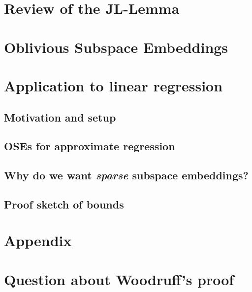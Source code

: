 \documentclass[11pt]{article}
\begin{document}
\section{Review of the JL-Lemma}


\section{Oblivious Subspace Embeddings}


\section{Application to linear regression}
\subsection{Motivation and setup}


\subsection{OSEs for approximate regression}


\subsection{Why do we want \textit{sparse} subspace embeddings?}


\subsection{Proof sketch of bounds}






\newpage
\section*{Appendix}
\appendix
\section{Question about Woodruff's proof}
\label{app:question}

\end{document}
